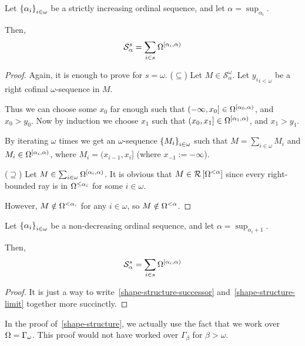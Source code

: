 \begin{lemma}\label{shape-structure-limit}
  Let $\left\{ {\alpha_i} \right\}_{i \in \omega}$ be a strictly
  increasing ordinal sequence, and let $\alpha = \sup_{\alpha_i}$.

  Then,
  \[
    \mathcal{S}^{s}_{\alpha} = \sum_{i \in s}{\Omega^{[\alpha_i, \alpha)}}
  \]
\end{lemma}

\begin{proof}
  Again, it is enough to prove for $s = \omega$.
  ($\subseteq$) Let $M \in \mathcal{S}^{\omega}_{\alpha}$.
  Let ${y_i}_{i < \omega}$ be a right cofinal $\omega$-sequence in $M$.

  Thus we can choose some $x_0$ far enough such that $(-\infty, x_0] \in \Omega^{[\alpha_0, \alpha)}$,
  and $x_0 > y_0$.
  Now by induction we choose $x_1$ such that $(x_0, x_1] \in \Omega^{[\alpha_1, \alpha)}$,
  and $x_1 > y_1$.

  By iterating $\omega$ times we get an $\omega$-sequence $\left\{ {M_i} \right\}_{i \in \omega}$
  such that $M = \sum_{i \in \omega} M_i$ and $M_i \in \Omega^{[\alpha_i, \alpha)}$,
  where $M_i = (x_{i-1}, x_i]$ (where $x_{-1} := -\infty$).


  ($\supseteq$) Let $M \in \sum_{i \in \omega}{\Omega^{[\alpha_i, \alpha)}}$.
  It is obvious that $M \in \mathcal{R} \left[ {{\Omega^{< \alpha}}} \right]$ since every right-bounded
  ray is in $\Omega^{\le \alpha_i}$ for some $i \in \omega$.

  However, $M \notin \Omega^{< \alpha_i}$ for any $i \in \omega$, so $M \notin \Omega^{< \alpha}$.


\end{proof}

\begin{lemma}\label{shape-structure}
  Let $\left\{ {\alpha_i} \right\}_{i \in \omega}$ be a non-decreasing ordinal sequence,
  and let $\alpha = \sup_{\alpha_i + 1}$.

  Then,
  \[
    \mathcal{S}^{s}_{\alpha} = \sum_{i \in s}{\Omega^{[\alpha_i, \alpha)}}
  \]
\end{lemma}

\begin{proof}
  It is just a way to write~\cref{shape-structure-successor} and~\cref{shape-structure-limit}
  together more succinctly.
\end{proof}

\begin{note}
  In the proof of~\cref{shape-structure}, we actually use the fact that
  we work over $\Omega = \Gamma_{\omega}$. This proof would not have worked over $\Gamma_{\beta}$
  for $\beta > \omega$.
\end{note}
